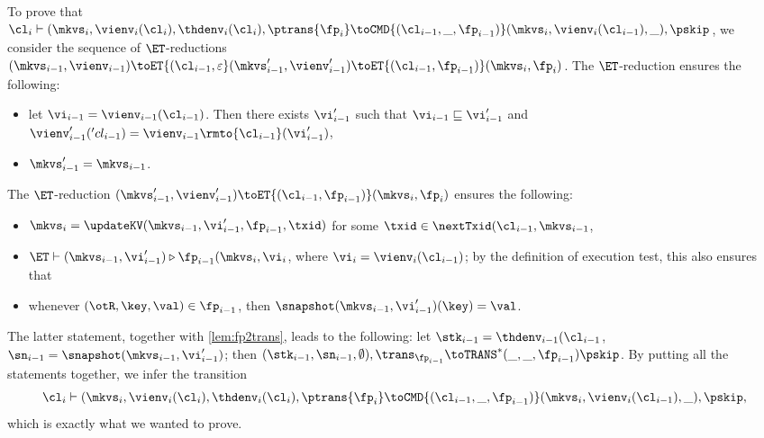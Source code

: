 \begin{itemize}
To prove that $\cl_{i} \vdash (\mkvs_i, \vienv_{i}(\cl_{i}), \thdenv_{i}(\cl_{i}), \ptrans{\fp_{i}} 
\toCMD{(\cl_{i-1}, \_, \fp_{i-1})} (\mkvs_{i}, \vienv_{i}(\cl_{i-1}), \_), \pskip$, 
we consider the sequence of $\ET$-reductions $(\mkvs_{i-1}, \vienv_{i-1}) \toET{(\cl_{i-1}, \varepsilon} (\mkvs_{i-1}', \vienv_{i-1}') 
\toET{(\cl_{i-1}, \fp_{i-1})} (\mkvs_{i}, \fp_{i})$. The $\ET$-reduction ensures the following: 
\begin{itemize}
\item let $\vi_{i-1} = \vienv_{i-1}(\cl_{i-1})$. Then there exists $\vi_{i-1}'$ such that $\vi_{i-1} \sqsubseteq \vi_{i-1}'$ and
$\vienv_{i-1}'('cl_{i-1}) = \vienv_{i-1}\rmto{\cl_{i-1}}(\vi_{i-1}')$, 
\item $\mkvs_{i-1}' = \mkvs_{i-1}$.
\end{itemize}
The $\ET$-reduction $(\mkvs_{i-1}', \vienv_{i-1}') 
\toET{(\cl_{i-1}, \fp_{i-1})} (\mkvs_{i}, \fp_{i})$ ensures the following: 
\begin{itemize}
\item $\mkvs_i = \updateKV(\mkvs_{i-1}, \vi_{i-1}', \fp_{i-1}, \txid)$ for some $\txid \in \nextTxid(\cl_{i-1}, \mkvs_{i-1}$, 
\item $\ET \vdash (\mkvs_{i-1}, \vi_{i-1}') \triangleright \fp_{i-1} (\mkvs_{i}, \vi_{i}$, where $\vi_{i} = \vienv_{i}(\cl_{i-1})$; 
by the definition of execution test, this also ensures that 
\item whenever $(\otR, \key, \val) \in \fp_{i-1}$, then $\snapshot(\mkvs_{i-1}, \vi_{i-1}')(\key) = \val$.
\end{itemize}
The latter statement, together with \cref{lem:fp2trans}, leads to the following: let $\stk_{i-1} = \thdenv_{i-1}(\cl_{i-1}$, 
$\sn_{i-1} = \snapshot(\mkvs_{i-1}, \vi_{i-1}')$; then 
$(\stk_{i-1}, \sn_{i-1}, \emptyset), \trans_{\fp_{i-1}} \toTRANS^{\ast} (\_, \_, \fp_{i-1}) \pskip$. 
By putting all the statements together, we infer the transition 
\[\cl_{i} \vdash (\mkvs_i, \vienv_{i}(\cl_{i}), \thdenv_{i}(\cl_{i}), \ptrans{\fp_{i}} 
\toCMD{(\cl_{i-1}, \_, \fp_{i-1})} (\mkvs_{i}, \vienv_{i}(\cl_{i-1}), \_), \pskip,\]
which is exactly 
what we wanted to prove.
\end{itemize}
%
%
%
